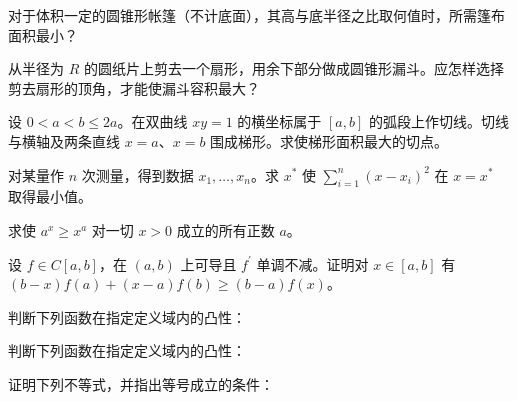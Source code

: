 \newpage
\noindent\begin{minipage}{\textwidth}
对于体积一定的圆锥形帐篷（不计底面），其高与底半径之比取何值时，所需篷布面积最小？
\end{minipage}\par\vfill
\noindent\begin{minipage}{\textwidth}
从半径为 $R$ 的圆纸片上剪去一个扇形，用余下部分做成圆锥形漏斗。应怎样选择剪去扇形的顶角，才能使漏斗容积最大？
\end{minipage}\par\vfill
\noindent\begin{minipage}{\textwidth}
设 $0<a<b\le2a$。在双曲线 $xy=1$ 的横坐标属于 $[a,b]$ 的弧段上作切线。切线与横轴及两条直线 $x=a$、$x=b$ 围成梯形。求使梯形面积最大的切点。
\end{minipage}\par\vfill
\newpage
\noindent\begin{minipage}{\textwidth}
对某量作 $n$ 次测量，得到数据 $x_1,\ldots,x_n$。求 $x^*$ 使 $\sum_{i=1}^n(x-x_i)^2$ 在 $x=x^*$ 取得最小值。
\end{minipage}\par\vfill
\noindent\begin{minipage}{\textwidth}
求使 $a^x\ge x^a$ 对一切 $x>0$ 成立的所有正数 $a$。
\end{minipage}\par\vfill
\noindent\begin{minipage}{\textwidth}
设 $f\in C[a,b]$，在 $(a,b)$ 上可导且 $f^{\prime}$ 单调不减。证明对 $x\in[a,b]$ 有 $(b-x)f(a)+(x-a)f(b)\ge(b-a)f(x)$。
\end{minipage}\par\vfill
\newpage
\noindent\begin{minipage}{\textwidth}
判断下列函数在指定定义域内的凸性：
\end{minipage}\par\vfill
\noindent\begin{minipage}{\textwidth}
判断下列函数在指定定义域内的凸性：
\end{minipage}\par\vfill
\noindent\begin{minipage}{\textwidth}
证明下列不等式，并指出等号成立的条件：
\end{minipage}\par\vfill

